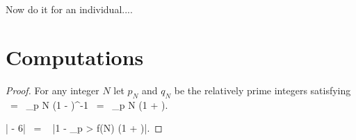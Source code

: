 Now do it for an individual....

\newpage

\appendix


\section{Computations}

\begin{proof} For any integer $N$ let $p_N$ and $q_N$ be the
relatively prime integers satisfying
\be
{} \ = \ \prod_{p \le N} \left(1 -
\right)^{-1} \ = \ \prod_{p \le N} \left(1 + \right).
\ee

\lipsum[10]

\be \left| - 6\right| \ = \  \left|1 - \prod_{p > f(N)} \left(1 + \right)\right|.
\ee

\end{proof}


\medskip

\renewcommand{\mkbibnamefamily}[1]{\textsc{#1}} %
\printbibliography


